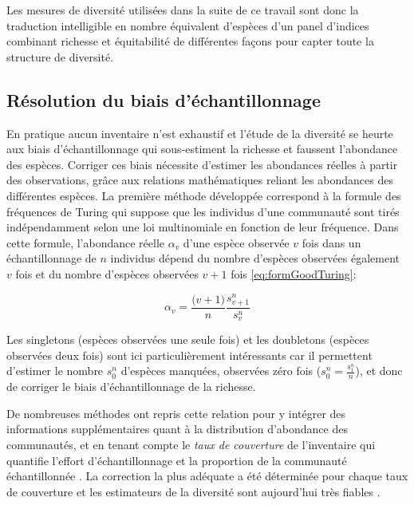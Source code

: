 \documentclass[
  11pt,
  french,
  A4paper,
  extrafontsizes,onecolumn,openright
  ]{memoir}
\begin{document}
Les mesures de diversité utilisées dans la suite de ce travail sont donc
la traduction intelligible en nombre équivalent d'espèces d'un panel
d'indices combinant richesse et équitabilité de différentes façons pour
capter toute la structure de diversité.

\subsection{Résolution du biais
d'échantillonnage}\label{resolution-du-biais-dechantillonnage}

En pratique aucun inventaire n'est exhaustif et l'étude de la diversité
se heurte aux biais d'échantillonnage qui sous-estiment la richesse et
faussent l'abondance des espèces. Corriger ces biais nécessite d'estimer
les abondances réelles à partir des observations, grâce aux relations
mathématiques reliant les abondances des différentes espèces. La
première méthode développée correspond à la formule des fréquences de
Turing \autocite{Good1953} qui suppose que les individus d'une
communauté sont tirés indépendamment selon une loi multinomiale en
fonction de leur fréquence. Dans cette formule, l'abondance réelle
\(\alpha_v\) d'une espèce observée \(v\) fois dans un échantillonnage de
\(n\) individus dépend du nombre d'espèces observées également \(v\)
fois et du nombre d'espèces observées \(v+1\) fois
\eqref{eq:formGoodTuring}:

\begin{equation}
\alpha_v=\frac{\big(v+1\big)}{n}\frac{s^n_{v+1}}{s^n_v}
\label{eq:formGoodTuring}
\end{equation}

Les singletons (espèces observées une seule fois) et les doubletons
(espèces observées deux fois) sont ici particulièrement intéressants car
il permettent d'estimer le nombre \(s^n_0\) d'espèces manquées,
observées zéro fois (\(s^n_0=\frac{s^n_1}{n}\)), et donc de corriger le
biais d'échantillonnage de la richesse.

De nombreuses méthodes ont repris cette relation pour y intégrer des
informations supplémentaires quant à la distribution d'abondance des
communautés, et en tenant compte le \emph{taux de couverture} de
l'inventaire qui quantifie l'effort d'échantillonnage et la proportion
de la communauté échantillonnée \autocite{Dauby2012}. La correction la
plus adéquate a été déterminée pour chaque taux de couverture et les
estimateurs de la diversité sont aujourd'hui très fiables
\autocites{Chao2015}{Marcon2015b}.
\end{document}
